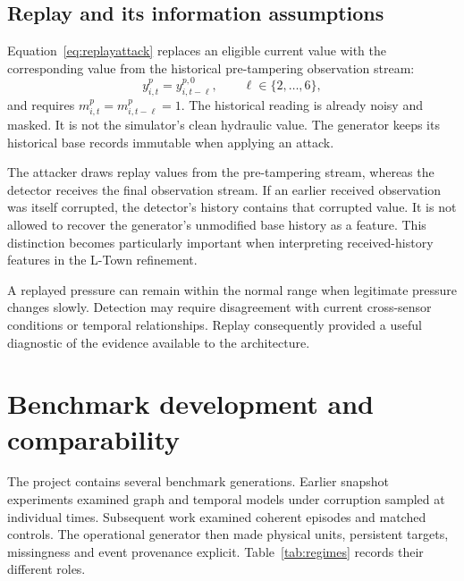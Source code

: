 \subsection{Replay and its information assumptions}
Equation~\eqref{eq:replayattack} replaces an eligible current value with the corresponding value from the historical pre-tampering observation stream:
\begin{equation}
 y^p_{i,t}=y^{p,0}_{i,t-\ell},\qquad \ell\in\{2,\ldots,6\},\label{eq:replayattack}
\end{equation}
and requires $m^p_{i,t}=m^p_{i,t-\ell}=1$. The historical reading is already noisy and masked. It is not the simulator's clean hydraulic value. The generator keeps its historical base records immutable when applying an attack.

The attacker draws replay values from the pre-tampering stream, whereas the detector receives the final observation stream. If an earlier received observation was itself corrupted, the detector's history contains that corrupted value. It is not allowed to recover the generator's unmodified base history as a feature. This distinction becomes particularly important when interpreting received-history features in the L-Town refinement.

A replayed pressure can remain within the normal range when legitimate pressure changes slowly. Detection may require disagreement with current cross-sensor conditions or temporal relationships. Replay consequently provided a useful diagnostic of the evidence available to the architecture.

\section{Benchmark development and comparability}
The project contains several benchmark generations. Earlier snapshot experiments examined graph and temporal models under corruption sampled at individual times. Subsequent work examined coherent episodes and matched controls. The operational generator then made physical units, persistent targets, missingness and event provenance explicit. Table~\ref{tab:regimes} records their different roles.

